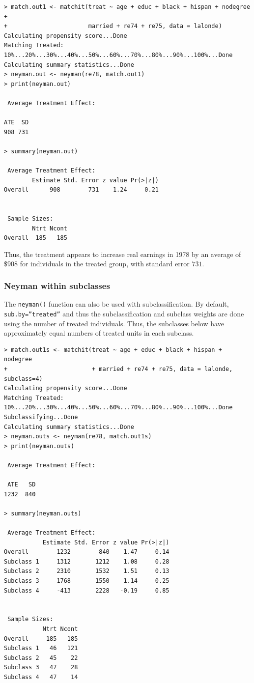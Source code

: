 \documentclass[oneside,letterpaper,titlepage]{article}
\begin{document}
\begin{verbatim}
> match.out1 <- matchit(treat ~ age + educ + black + hispan + nodegree +
+                       married + re74 + re75, data = lalonde)
Calculating propensity score...Done
Matching Treated: 10%...20%...30%...40%...50%...60%...70%...80%...90%...100%...Done
Calculating summary statistics...Done
> neyman.out <- neyman(re78, match.out1)
> print(neyman.out)
 
 Average Treatment Effect:
  
ATE  SD
908 731
 
> summary(neyman.out)
 
 Average Treatment Effect:
        Estimate Std. Error z value Pr(>|z|)
Overall      908        731    1.24     0.21
 
 
 Sample Sizes:
        Ntrt Ncont
Overall  185   185
\end{verbatim}

Thus, the treatment appears to increase real earnings in 1978 by an average of $\$908$ for 
individuals in the treated group, with standard error $731$. 

\subsubsection{Neyman within subclasses}
The {\tt neyman()} function can also be used with subclassification.  By default, {\tt sub.by=''treated''} and thus the
subclassification and subclass weights are done using the number of treated individuals.  Thus, the subclasses below have approximately equal
numbers of treated units in each subclass.

\begin{verbatim}
> match.out1s <- matchit(treat ~ age + educ + black + hispan + nodegree
+                        + married + re74 + re75, data = lalonde, subclass=4)
Calculating propensity score...Done
Matching Treated: 10%...20%...30%...40%...50%...60%...70%...80%...90%...100%...Done
Subclassifying...Done
Calculating summary statistics...Done
> neyman.outs <- neyman(re78, match.out1s)
> print(neyman.outs)
 
 Average Treatment Effect:
  
 ATE   SD
1232  840
 
> summary(neyman.outs)
 
 Average Treatment Effect:
           Estimate Std. Error z value Pr(>|z|)
Overall        1232        840    1.47     0.14
Subclass 1     1312       1212    1.08     0.28
Subclass 2     2310       1532    1.51     0.13
Subclass 3     1768       1550    1.14     0.25
Subclass 4     -413       2228   -0.19     0.85
 
 
 Sample Sizes:
           Ntrt Ncont
Overall     185   185
Subclass 1   46   121
Subclass 2   45    22
Subclass 3   47    28
Subclass 4   47    14
\end{verbatim}
\end{document}
